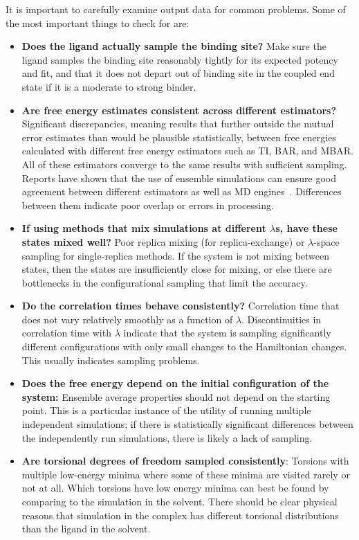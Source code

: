 It is important to carefully examine output data for common problems. Some of the most important things to check for are:
\begin{itemize}
\item \textbf{Does the ligand actually sample the binding site?} Make sure the ligand samples the binding site reasonably tightly for its expected potency and fit, and that it does not depart out of binding site in the coupled end state if it is a moderate to strong binder. 
\item \textbf{Are free energy estimates consistent across different estimators?} Significant discrepancies, meaning results that further outside the mutual error estimates than would be plausible statistically, between free energies calculated with different free energy estimators such as TI, BAR, and MBAR. All of these estimators converge to the same results with sufficient sampling. Reports have shown that the use of ensemble simulations can ensure good agreement between different estimators as well as MD engines~\cite{wade2022}. Differences between them indicate poor overlap or errors in processing.
\item \textbf{If using methods that mix simulations at different $\lambda$s, have these states mixed well?} Poor replica mixing (for replica-exchange) or $\lambda$-space sampling for single-replica methods. If the system is not mixing between states, then the states are insufficiently close for mixing, or else there are bottlenecks in the configurational sampling that limit the accuracy.
\item \textbf{Do the correlation times behave consistently?} Correlation time that does not vary relatively smoothly as a function of $\lambda$. Discontinuities in correlation time with $\lambda$ indicate that the system is sampling significantly different configurations with only small changes to the Hamiltonian changes. This usually indicates sampling problems.
\item \textbf{Does the free energy depend on the initial configuration of the system:} Ensemble average properties should not depend on the starting point.  This is a particular instance of the utility of running multiple independent simulations; if there is statistically significant differences between the independently run simulations, there is likely a lack of sampling. 
\item \textbf{Are torsional degrees of freedom sampled consistently}: Torsions with multiple low-energy minima where some of these minima are visited rarely or not at all. Which torsions have low energy minima can best be found by comparing to the simulation in the solvent. There should be clear physical reasons that simulation in the complex has different torsional distributions than the ligand in the solvent. 

\end{itemize}
